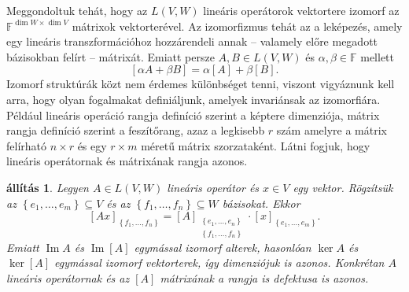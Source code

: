 \documentclass[9pt, a4paper, showtrims]{memoir}
\theoremstyle{plain}
\newtheorem{proposition}{állítás}[chapter]
\theoremstyle{remark}
\theoremstyle{definition}
\DeclareMathOperator{\im}{Im}
\begin{document}
Meggondoltuk tehát, hogy az $L\left( V,W \right)$ lineáris operátorok vektortere izomorf az
$\mathbb{F}^{\dim W\times \dim V}$ mátrixok vektorterével. 
Az izomorfizmus tehát az a leképezés, 
amely egy lineáris transzformációhoz hozzárendeli annak 
-- valamely előre megadott bázisokban felírt -- 
mátrixát.
Emiatt persze $A,B\in L\left( V,W \right)$ és $\alpha,\beta\in\mathbb{F}$ mellett
\begin{equation}\label{eq:vt}
    \left[ \alpha A+\beta B \right]=\alpha\left[ A \right]+\beta\left[ B \right].
\end{equation}
Izomorf struktúrák közt nem érdemes különbséget tenni, viszont vigyáznunk kell arra,
hogy olyan fogalmakat definiáljunk, amelyek invariánsak az izomorfiára.
Például lineáris operáció rangja definíció szerint a képtere dimenziója, 
mátrix rangja definíció szerint a feszítőrang, azaz a legkisebb 
$r$ szám amelyre a mátrix felírható $n\times r$ és egy $r\times m$ méretű mátrix szorzataként.
Látni fogjuk, hogy lineáris operátornak és mátrixának rangja azonos.
\begin{proposition}
    Legyen $A\in L\left( V,W \right)$ lineáris operátor és $x\in V$ egy vektor.
    Rögzítsük az $\left\{ e_1,\dots,e_m \right\}\subseteq V$ és az $\left\{ f_1,\dots,f_n \right\}\subseteq W$ bázisokat.
    Ekkor 
    \[
        [Ax]_{\left\{ f_1,\dots,f_n \right\}}
        =
        [A]_{\substack{\left\{ e_1,\dots,e_n \right\}\\ \left\{ f_1,\dots,f_n \right\}}}
        \cdot 
        [x]_{\left\{ e_1,\dots,e_m \right\}}.
    \]
    Emiatt $\im A$ és $\im[A]$ egymással izomorf alterek, hasonlóan $\ker A$ és $\ker[A]$ egymással
    izomorf vektorterek, így dimenziójuk is azonos.
    Konkrétan $A$ lineáris operátornak és az $[A]$ mátrixának a rangja is defektusa is azonos.
\end{proposition}
\end{document}
